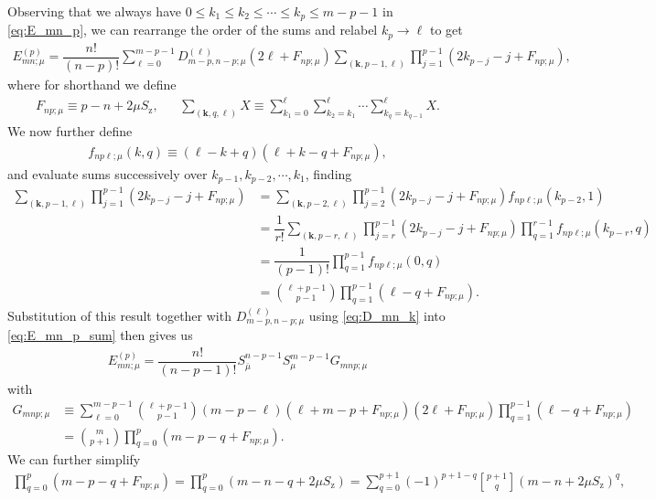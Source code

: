 \documentclass[aps,notitlepage,nofootinbib,11pt]{revtex4-1}
\newcommand{\f}[2]{\dfrac{#1}{#2}} %
\newcommand{\p}[1]{\left(#1\right)} %
\renewcommand{\v}{\bm} %
\newcommand{\z}{\text{z}}
\newcommand{\bmu}{{\bar\mu}}
\newcommand{\1}{\mathds{1}}
\begin{document}
Observing that we always have
$0\le k_1\le k_2\le\cdots\le k_p\le m-p-1$ in \eqref{eq:E_mn_p}, we
can rearrange the order of the sums and relabel $k_p\to\ell$ to get
\begin{align}
  E_{mn;\mu}^{(p)}
  = \f{n!}{\p{n-p}!}
  \sum_{\ell=0}^{m-p-1} D_{m-p,n-p;\mu}^{(\ell)} \p{2\ell+F_{np;\mu}}
  \sum_{\p{\v k,p-1,\ell}} \prod_{j=1}^{p-1} \p{2k_{p-j}-j+F_{np;\mu}},
  \label{eq:E_mn_p_sum}
\end{align}
where for shorthand we define
\begin{align}
  F_{np;\mu} \equiv p - n + 2\mu S_\z,
  &&
  \sum_{\p{\v k,q,\ell}} X \equiv
  \sum_{k_1=0}^\ell \sum_{k_2=k_1}^\ell
  \cdots \sum_{k_q=k_{q-1}}^\ell X.
\end{align}
We now further define
\begin{align}
  f_{np\ell;\mu}\p{k,q} \equiv \p{\ell-k+q} \p{\ell+k-q+F_{np;\mu}},
\end{align}
and evaluate sums successively over $k_{p-1},k_{p-2},\cdots,k_1$,
finding
\begin{align}
  \sum_{\p{\v k,p-1,\ell}} \prod_{j=1}^{p-1} \p{2k_{p-j}-j+F_{np;\mu}}
  &= \sum_{\p{\v k,p-2,\ell}}
  \prod_{j=2}^{p-1} \p{2k_{p-j}-j+F_{np;\mu}}
  f_{np\ell;\mu}\p{k_{p-2},1} \\
  &= \f1{r!} \sum_{\p{\v k,p-r,\ell}}
  \prod_{j=r}^{p-1} \p{2k_{p-j}-j+F_{np;\mu}}
  \prod_{q=1}^{r-1} f_{np\ell;\mu}\p{k_{p-r},q} \\
  &= \f1{\p{p-1}!} \prod_{q=1}^{p-1} f_{np\ell;\mu}\p{0,q} \\
  &= { \ell + p - 1 \choose p - 1 }
  \prod_{q=1}^{p-1} \p{\ell-q+F_{np;\mu}}.
\end{align}
Substitution of this result together with $D_{m-p,n-p;\mu}^{(\ell)}$
using \eqref{eq:D_mn_k} into \eqref{eq:E_mn_p_sum} then gives us
\begin{align}
  E_{mn;\mu}^{(p)}
  = \f{n!}{\p{n-p-1}!} S_\bmu^{n-p-1} S_\mu^{m-p-1} G_{mnp;\mu}
\end{align}
with
\begin{align}
  G_{mnp;\mu}
  &\equiv \sum_{\ell=0}^{m-p-1} { \ell + p - 1 \choose p - 1 }
  \p{m-p-\ell} \p{\ell+m-p+F_{np;\mu}}
  \p{2\ell + F_{np;\mu}}
  \prod_{q=1}^{p-1} \p{\ell-q+F_{np;\mu}} \\
  &= { m \choose p + 1 } \prod_{q=0}^p \p{m-p-q+F_{np;\mu}}.
\end{align}
We can further simplify
\begin{align}
  \prod_{q=0}^p \p{m-p-q+F_{np;\mu}}
  = \prod_{q=0}^p \p{m-n-q+2\mu S_\z}
  = \sum_{q=0}^{p+1} \p{-1}^{p+1-q}
  { p+1 \brack q } \p{m-n+2\mu S_\z}^q,
\end{align}
\end{document}
